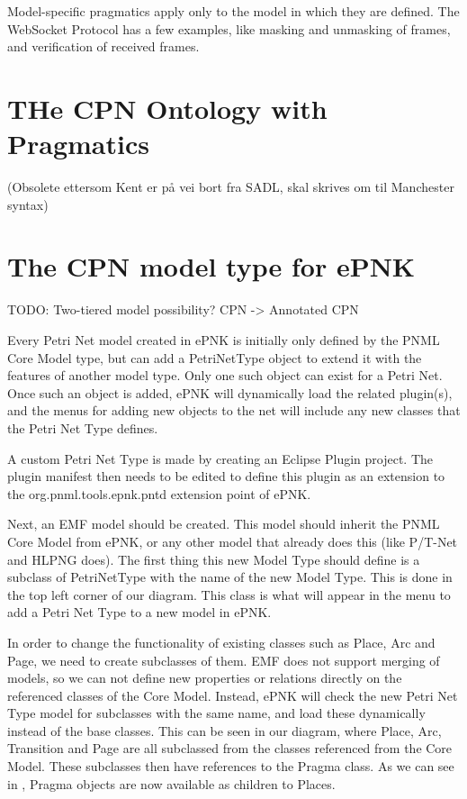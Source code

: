 Model-specific pragmatics apply only to the model in which they are defined. The
WebSocket Protocol has a few examples, like masking and unmasking of frames, and
verification of received frames.

\section{THe CPN Ontology with Pragmatics}
(Obsolete ettersom Kent er på vei bort fra SADL, skal skrives om til Manchester
syntax)

\section{The CPN model type for ePNK}

TODO: Two-tiered model possibility? CPN -> Annotated CPN

Every Petri Net model created in ePNK is initially only
defined by the PNML Core Model type, but can add a PetriNetType object to extend
it with the features of another model type. Only one such object can exist for a
Petri Net. Once such an object is added, ePNK will dynamically load the related
plugin(s), and the menus for adding new objects to the net will include any new
classes that the Petri Net Type defines.

A custom Petri Net Type is made by creating an Eclipse Plugin project.
The plugin manifest then needs to be edited to define this plugin as an
extension to the org.pnml.tools.epnk.pntd extension point of ePNK.

Next, an EMF model should be created. This model should inherit
the PNML Core Model from ePNK, or any other model that already does this (like
P/T-Net and HLPNG does). The first thing this new Model Type should define is a
subclass of PetriNetType with the name of the new Model Type. This is done in
the top left corner of our diagram. This class is what will appear in the menu
to add a Petri Net Type to a new model in ePNK. 

In order to change the functionality of existing classes such as Place, Arc and
Page, we need to create subclasses of them. EMF does not support merging of
models, so we can not define new properties or relations directly on the
referenced classes of the Core Model. Instead, ePNK will check the new Petri Net
Type model for subclasses with the same name, and load these dynamically instead
of the base classes. This can be seen in our diagram, where Place, Arc,
Transition and Page are all subclassed from the classes referenced from the Core
Model. These subclasses then have references to the Pragma class. As we can see
in , Pragma objects are now available as
children to Places.

